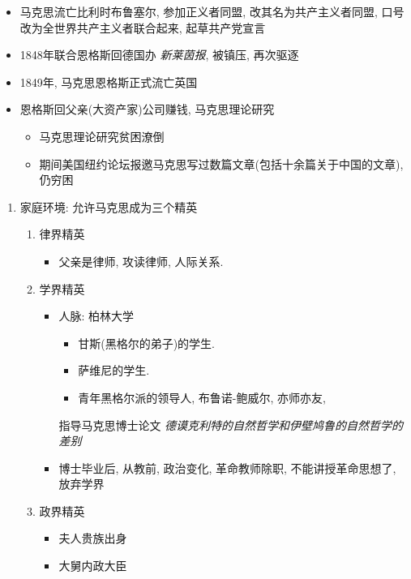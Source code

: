 \documentclass[11pt]{article}
\begin{document}
\begin{itemize}
\item 马克思流亡比利时布鲁塞尔, 参加正义者同盟, 改其名为共产主义者同盟, 口号改为全世界共产主义者联合起来, 起草共产党宣言
\item 1848年联合恩格斯回德国办 \emph{新莱茵报}, 被镇压, 再次驱逐
\item 1849年, 马克思恩格斯正式流亡英国
\item 恩格斯回父亲(大资产家)公司赚钱, 马克思理论研究
\begin{itemize}
\item 马克思理论研究贫困潦倒
\item 期间美国纽约论坛报邀马克思写过数篇文章(包括十余篇关于中国的文章), 仍穷困
\end{itemize}
\end{itemize}

\begin{enumerate}
\item 家庭环境: 允许马克思成为三个精英
\label{sec:org8ed4844}
\begin{enumerate}
\item 律界精英
\label{sec:org42f2dad}
\begin{itemize}
\item 父亲是律师, 攻读律师, 人际关系.
\end{itemize}
\item 学界精英
\label{sec:org1114725}
\begin{itemize}
\item 人脉: 柏林大学
\begin{itemize}
\item 甘斯(黑格尔的弟子)的学生.
\item 萨维尼的学生.
\item 青年黑格尔派的领导人, 布鲁诺-鲍威尔, 亦师亦友,
\end{itemize}
指导马克思博士论文 \emph{德谟克利特的自然哲学和伊壁鸠鲁的自然哲学的差别}
\item 博士毕业后, 从教前, 政治变化, 革命教师除职, 不能讲授革命思想了, 放弃学界
\end{itemize}
\item 政界精英
\label{sec:org6804aa3}
\begin{itemize}
\item 夫人贵族出身
\item 大舅内政大臣
\end{itemize}
\end{enumerate}


\end{enumerate}
\end{document}
